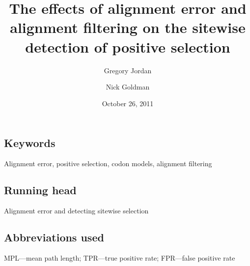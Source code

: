 \documentclass{article}
\begin{document}
\renewcommand\refname{Literature Cited}

\newcommand{\mtwo}{PAML M2a\xspace}
\newcommand{\meight}{PAML M8\xspace}
\newcommand{\pranka}{PRANK$_{\textrm{AA}}$\xspace}
\newcommand{\prankc}{PRANK$_{\textrm{C}}$\xspace}
\newcommand{\omg}{\bm{\omega}\xspace}
\newcommand{\tpr}{TPR$_{1\%}$\xspace}
\newcommand{\tprf}{TPR$_{5\%}$\xspace}
\newcommand{\sw}{sitewise\xspace}
\newcommand{\Sw}{Sitewise\xspace}
\newcommand{\Dr}{{\emph{Drosophila}}\xspace}
\newcommand{\tcr}[1]{#1}
\newcommand{\tcrr}[1]{#1}
\newcommand{\nsyn}{nonsynonymous\xspace}
\newcommand{\syn}{synonymous\xspace}
\newcommand{\nh}{non-homologous\xspace}
\newcommand{\hidegraphics}[2]{}

\title{The effects of alignment error and alignment filtering on the \sw detection of positive selection}
\date{October 26, 2011}
\author[1]{Gregory Jordan}
\author[1,*]{Nick Goldman}

\maketitle

\subsection*{Keywords}
Alignment error, positive selection, codon models, alignment filtering

\subsection*{Running head}
Alignment error and detecting sitewise selection

\subsection*{Abbreviations used}
MPL---mean path length; TPR---true positive rate; FPR---false positive rate

\newpage
\end{document}
